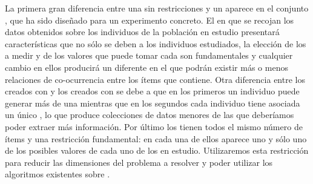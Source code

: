 La primera gran diferencia entre una \transaccion sin restricciones y un \registro aparece en el conjunto \I, que ha sido diseñado para un experimento concreto. El \dataset en que se recojan los datos obtenidos sobre los individuos de la población en estudio presentará características que no sólo se deben a los individuos estudiados, la elección de los \atributos a medir y de los valores que puede tomar cada \atributo son fundamentales y cualquier cambio en ellos producirá un \dataset diferente en el que podrán existir más o menos relaciones de co-ocurrencia entre los ítems que contiene. Otra diferencia entre los \datasets creados con \transacciones y los creados con \registros se debe a que en los primeros un individuo puede generar más de una \transaccion mientras que en los segundos cada individuo tiene asociada un único \registro, lo que produce colecciones de datos menores de las que deberíamos poder extraer más información. Por último los \registros tienen todos el mismo número de ítems y una restricción fundamental: en cada una de ellos aparece uno y sólo uno de los posibles valores de cada uno de los \atributos en estudio. Utilizaremos esta restricción para reducir las dimensiones del problema a resolver y poder utilizar los algoritmos existentes sobre \ARM.

